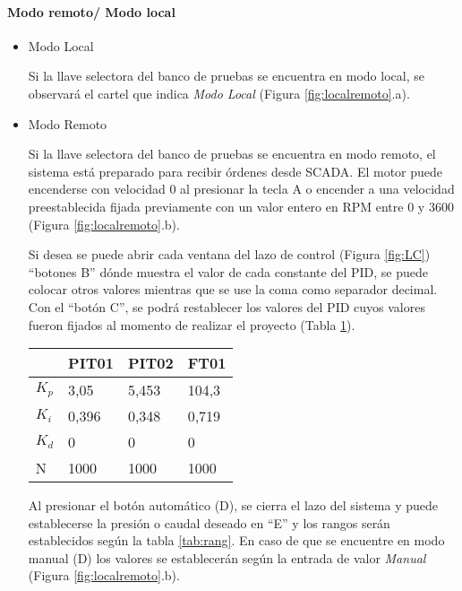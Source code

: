 \paragraph{Modo remoto/ Modo local}
\begin{itemize}
	\item Modo Local
	
	Si la llave selectora del banco de pruebas se encuentra en modo local, se observará el cartel que indica \textit{Modo Local} (Figura \ref{fig:localremoto}.a).
	
	\item Modo Remoto
	
	Si la llave selectora del banco de pruebas se encuentra en modo remoto, el sistema está preparado para recibir órdenes desde SCADA. El motor puede encenderse con velocidad 0 al presionar la tecla A o encender a una velocidad preestablecida fijada previamente con un valor entero en RPM entre 0 y 3600 (Figura \ref{fig:localremoto}.b). 
	
	Si desea se puede abrir cada ventana del lazo de control (Figura \ref{fig:LC}) ``botones B'' dónde muestra el valor de cada constante del PID, se puede colocar otros valores mientras que se use la coma como separador decimal. Con el ``botón C'', se podrá restablecer los valores del PID cuyos valores fueron fijados al momento de realizar el proyecto (Tabla \ref{tab:pid2}).
	
	\begin{table}[h]
		\centering
		\begin{tabular}{|l|l|l|l|}
			\hline
			& PIT01 & PIT02 & FT01 \\ \hline
			$K_p$ & 3,05 & 5,453 & 104,3 \\ \hline
			$K_i$ & 0,396 & 0,348 & 0,719 \\ \hline
			$K_d$ & 0 & 0 & 0 \\ \hline
			N & 1000 & 1000 & 1000 \\ \hline
		\end{tabular}
		\label{tab:pid2}
	\end{table}
	
		
	Al presionar el botón automático (D), se cierra el lazo del sistema y puede establecerse la presión o caudal deseado en ``E'' y los rangos serán establecidos según la tabla \ref{tab:rang}. En caso de que se encuentre en modo manual (D) los valores se establecerán según la entrada de valor \textit{Manual} (Figura \ref{fig:localremoto}.b). 
\end{itemize}

